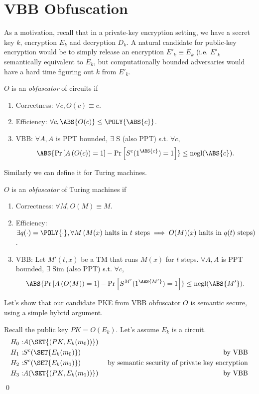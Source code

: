 \documentclass[12pt]{tufte-book}
\begin{document}
\section{VBB Obfuscation}
As a motivation, recall that in a private-key encryption setting, we have a secret key $k$, encryption $E_k$ and decryption $D_k$.
A natural candidate for public-key encryption would be to simply release an encryption $E'_k \equiv E_k$ (i.e. $E'_k$ semantically equivalent to $E_k$, but computationally bounded adversaries would have a hard time figuring out $k$ from $E'_k$.

\begin{definition}
	$O$ is an \emph{obfuscator} of circuits if \begin{enumerate}
		\item
			Correctness:
	$\forall c, O(c) \equiv c$.
	\item
		Efficiency:
		$\forall c, \ABS{O(c)} \le \POLY{\ABS{c}}$.
	\item
		VBB:
		$\forall A, A$ is PPT bounded, $\exists$ S (also PPT) s.t. $\forall c$,
		\[
			\ABS{\Pr\left[ A\left( O(c) \right) = 1\right] - \Pr\left[ S^c(1^{\ABS{c}}) = 1 \right]} \le \mathrm{negl}(\ABS{c}).
		\]
	\end{enumerate}
\end{definition}

Similarly we can define it for Turing machines.
\begin{definition}
	$O$ is an \emph{obfuscator} of Turing machines if \begin{enumerate}
		\item
			Correctness:
	$\forall M, O(M) \equiv M$.
	\item
		Efficiency:
		$\exists q(\cdot) = \POLY{\cdot}, \forall M \left( M(x) \hbox{ halts in }t \hbox{ steps} \implies O(M)(x) \hbox{ halts in }q(t) \hbox{ steps}\right)$.
	\item
		VBB:
		Let $M'(t,x)$ be a TM that runs $M(x)$ for $t$ steps.
		$\forall A, A$ is PPT bounded, $\exists$ Sim (also PPT) s.t. $\forall c$,
		\[
			\ABS{\Pr\left[ A\left( O(M) \right) = 1\right] - \Pr\left[ S^{M'}(1^{\ABS{M'}}) = 1 \right]} \le \mathrm{negl}(\ABS{M'}).
		\]
	\end{enumerate}
\end{definition}

Let's show that our candidate PKE from VBB obfuscator $O$ is semantic secure, using a simple hybrid argument.

\proof
Recall the public key $PK=O(E_k)$.
Let's assume $E_k$ is a circuit.
\begin{align*}
	H_0 :& A(\SET{(PK, E_k(m_0))}) & \\
	H_1 :& S^c(\SET{E_k(m_0)}) & \hbox{ by VBB} \\
	H_2 :& S^c(\SET{E_k(m_1)}) & \hbox{ by semantic security of private key encryption} \\
	H_3 :& A(\SET{(PK, E_k(m_1))}) & \hbox{ by VBB}
\end{align*}
\qed
\end{document}
